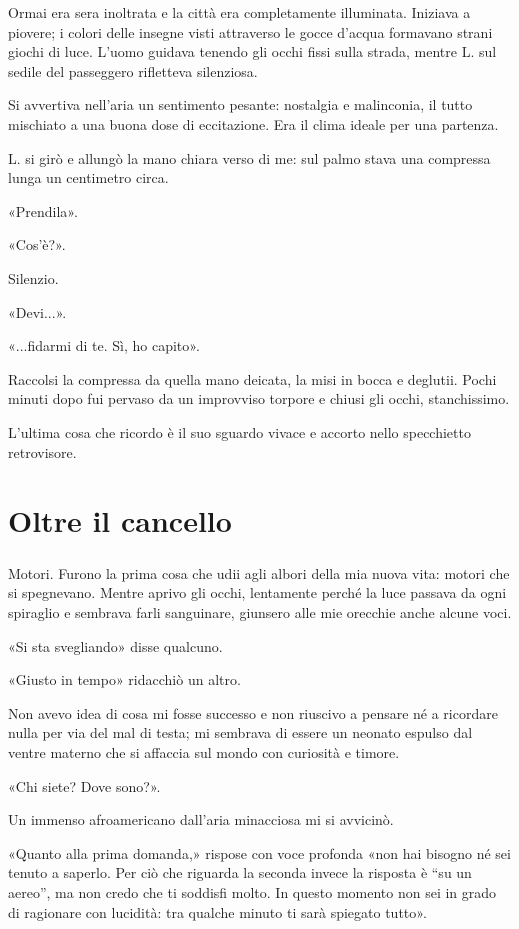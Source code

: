 \documentclass[a4paper,12pt]{book}
\begin{document}
Ormai era sera inoltrata e la città era completamente illuminata. Iniziava a
piovere; i colori delle insegne visti attraverso le gocce d'acqua formavano
strani giochi di luce. L'uomo guidava tenendo gli occhi fissi sulla strada,
mentre L. sul sedile del passeggero rifletteva silenziosa.

Si avvertiva nell'aria un sentimento pesante: nostalgia e malinconia, il tutto
mischiato a una buona dose di eccitazione. Era il clima ideale per una partenza.

L. si girò e allungò la mano chiara verso di me: sul palmo stava una compressa
lunga un centimetro circa.

«Prendila».

«Cos'è?».

Silenzio.

«Devi...».

«...fidarmi di te. Sì, ho capito».

Raccolsi la compressa da quella mano deicata, la misi in bocca e deglutii. Pochi
minuti dopo fui pervaso da un improvviso torpore e chiusi gli occhi,
stanchissimo.

L'ultima cosa che ricordo è il suo sguardo vivace e accorto nello specchietto
retrovisore.

\chapter{Oltre il cancello}

\paragraph{}
Motori. Furono la prima cosa che udii agli albori della mia nuova vita: motori
che si spegnevano. Mentre aprivo gli occhi, lentamente perché la luce passava
da ogni spiraglio e sembrava farli sanguinare, giunsero alle mie orecchie anche
alcune voci.

«Si sta svegliando» disse qualcuno.

«Giusto in tempo» ridacchiò un altro.

Non avevo idea di cosa mi fosse successo e non riuscivo a pensare né a ricordare
nulla per via del mal di testa; mi sembrava di essere un neonato espulso dal
ventre materno che si affaccia sul mondo con curiosità e timore.

«Chi siete? Dove sono?».

Un immenso afroamericano dall'aria minacciosa mi si avvicinò.

«Quanto alla prima domanda,» rispose con voce profonda «non hai bisogno né sei
tenuto a saperlo. Per ciò che riguarda la seconda invece la risposta è ``su un
aereo'', ma non credo che ti soddisfi molto. In questo momento non sei in grado
di ragionare con lucidità: tra qualche minuto ti sarà spiegato tutto».
\end{document}

